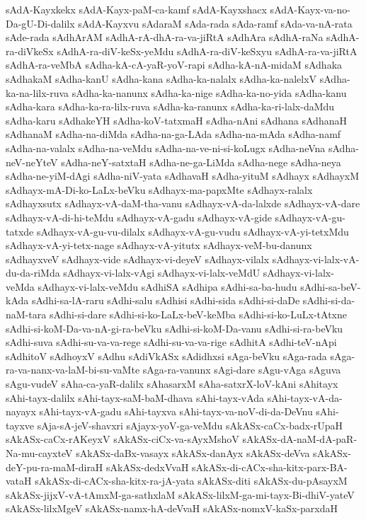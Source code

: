 {sAdA-Kayxkekx
sAdA-Kayx-paM-ca-kamf
sAdA-Kayxshacx
sAdA-Kayx-va-no-Da-gU-Di-dalilx
sAdA-Kayxvu
sAdaraM
sAda-rada
sAda-ramf
sAda-va-nA-rata
sAde-rada
sAdhArAM
sAdhA-rA-dhA-ra-va-jiRtA
sAdhAra
sAdhA-raNa
sAdhA-ra-diVkeSx
sAdhA-ra-diV-keSx-yeMdu
sAdhA-ra-diV-keSxyu
sAdhA-ra-va-jiRtA
sAdhA-ra-veMbA
sAdha-kA-cA-yaR-yoV-rapi
sAdha-kA-nA-midaM
sAdhaka
sAdhakaM
sAdha-kanU
sAdha-kana
sAdha-ka-nalalx
sAdha-ka-nalelxV
sAdha-ka-na-lilx-ruva
sAdha-ka-nanunx
sAdha-ka-nige
sAdha-ka-no-yida
sAdha-kanu
sAdha-kara
sAdha-ka-ra-lilx-ruva
sAdha-ka-ranunx
sAdha-ka-ri-lalx-daMdu
sAdha-karu
sAdhakeYH
sAdha-koV-tatxmaH
sAdha-nAni
sAdhana
sAdhanaH
sAdhanaM
sAdha-na-diMda
sAdha-na-ga-LAda
sAdha-na-mAda
sAdha-namf
sAdha-na-valalx
sAdha-na-veMdu
sAdha-na-ve-ni-si-koLugx
sAdha-neVna
sAdha-neV-neYteV
sAdha-neY-satxtaH
sAdha-ne-ga-LiMda
sAdha-nege
sAdha-neya
sAdha-ne-yiM-dAgi
sAdha-niV-yata
sAdhavaH
sAdha-yituM
sAdhayx
sAdhayxM
sAdhayx-mA-Di-ko-LaLx-beVku
sAdhayx-ma-papxMte
sAdhayx-ralalx
sAdhayxsutx
sAdhayx-vA-daM-tha-vanu
sAdhayx-vA-da-lalxde
sAdhayx-vA-dare
sAdhayx-vA-di-hi-teMdu
sAdhayx-vA-gadu
sAdhayx-vA-gide
sAdhayx-vA-gu-tatxde
sAdhayx-vA-gu-vu-dilalx
sAdhayx-vA-gu-vudu
sAdhayx-vA-yi-tetxMdu
sAdhayx-vA-yi-tetx-nage
sAdhayx-vA-yitutx
sAdhayx-veM-bu-danunx
sAdhayxveV
sAdhayx-vide
sAdhayx-vi-deyeV
sAdhayx-vilalx
sAdhayx-vi-lalx-vA-du-da-riMda
sAdhayx-vi-lalx-vAgi
sAdhayx-vi-lalx-veMdU
sAdhayx-vi-lalx-veMda
sAdhayx-vi-lalx-veMdu
sAdhiSA
sAdhipa
sAdhi-sa-ba-hudu
sAdhi-sa-beV-kAda
sAdhi-sa-lA-raru
sAdhi-salu
sAdhisi
sAdhi-sida
sAdhi-si-daDe
sAdhi-si-da-naM-tara
sAdhi-si-dare
sAdhi-si-ko-LaLx-beV-keMba
sAdhi-si-ko-LuLx-tAtxne
sAdhi-si-koM-Da-va-nA-gi-ra-beVku
sAdhi-si-koM-Da-vanu
sAdhi-si-ra-beVku
sAdhi-suva
sAdhi-su-va-va-rege
sAdhi-su-va-va-rige
sAdhitA
sAdhi-teV-nApi
sAdhitoV
sAdhoyxV
sAdhu
sAdiVkASx
sAdidhxsi
sAga-beVku
sAga-rada
sAga-ra-va-nanx-va-laM-bi-su-vaMte
sAga-ra-vanunx
sAgi-dare
sAgu-vAga
sAguva
sAgu-vudeV
sAha-ca-yaR-dalilx
sAhasarxM
sAha-satxrX-loV-kAni
sAhitayx
sAhi-tayx-dalilx
sAhi-tayx-saM-baM-dhava
sAhi-tayx-vAda
sAhi-tayx-vA-da-nayayx
sAhi-tayx-vA-gadu
sAhi-tayxva
sAhi-tayx-va-noV-di-da-DeVnu
sAhi-tayxve
sAja-sA-jeV-shavxri
sAjayx-yoV-ga-veMdu
sAkASx-caCx-badx-rUpaH
sAkASx-caCx-rAKeyxV
sAkASx-ciCx-va-sAyxMshoV
sAkASx-dA-naM-dA-paR-Na-mu-cayxteV
sAkASx-daBx-vasayx
sAkASx-danAyx
sAkASx-deVva
sAkASx-deY-pu-ra-maM-diraH
sAkASx-dedxVvaH
sAkASx-di-cACx-sha-kitx-parx-BA-vataH
sAkASx-di-cACx-sha-kitx-ra-jA-yata
sAkASx-diti
sAkASx-du-pAsayxM
sAkASx-jijxV-vA-tAmxM-ga-sathxlaM
sAkASx-lilxM-ga-mi-tayx-Bi-dhiV-yateV
sAkASx-lilxMgeV
sAkASx-namx-hA-deVvaH
sAkASx-nomxV-kaSx-parxdaH
}
